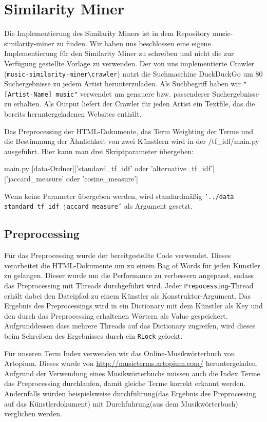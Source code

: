 \documentclass[prodmode,acmtecs]{acmsmall} %
\begin{document}
\section{Similarity Miner}
Die Implementierung des Similarity Miners ist in dem Repository music-similarity-miner \cite{music-similarity-miner} zu finden. Wir haben uns beschlossen eine eigene Implementierung für den Similarity Miner zu schreiben und nicht die zur Verfügung gestellte Vorlage zu verwenden. Der von uns implementierte Crawler (\lstinline$music-similarity-miner\crawler$) nutzt die Suchmaschine DuckDuckGo um 80 Suchergebnisse zu jedem Artist herunterzuladen. Als Suchbegriff haben wir \lstinline$"[Artist-Name] music"$ verwendet um genauere bzw. passenderer Suchergebnisse zu erhalten. Als Output liefert der Crawler für jeden Artist ein Textfile, das die bereits heruntergeladenen Websites enthält.

Das Preprocessing der HTML-Dokumente, das Term Weighting der Terme und die Bestimmung der Ähnlichkeit von zwei Künstlern wird in der /tf\_idf/main.py ausgeführt.
Hier kann man drei Skriptparameter übergeben: 
\begin{python}
main.py [data-Ordner]['standard_tf_idf' oder 'alternative_tf_idf']
['jaccard_measure' oder 'cosine_measure']
\end{python}
Wenn keine Parameter übergeben werden, wird standardmäßig \texttt{'../data standard\_tf\_idf jaccard\_measure'} als Argument gesetzt. 


\subsection{Preprocessing}
Für das Preprocessing wurde der bereitgestellte Code verwendet. Dieses verarbeitet die HTML-Dokumente um zu einem Bag of Words für jeden Künstler zu gelangen. Dieser wurde um die Performance zu verbessern angepasst, sodass das Preprocessing mit Threads durchgeführt wird. Jeder \texttt{Prepocessing}-Thread erhält dabei den Dateipfad zu einem Künstler als Konstruktor-Argument. Das Ergebnis des Preprocessings wird in ein Dictionary mit dem Künstler als Key und den durch das Preprocessing erhaltenen Wörtern als Value gespeichert. Aufgrunddessen dass mehrere Threads auf das Dictionary zugreifen, wird dieses beim Schreiben des Ergebnisses durch ein \texttt{RLock} gelockt.

Für unseren Term Index verwenden wir das Online-Musikwörterbuch von Artopium. Dieses wurde von \url{http://musicterms.artopium.com/} heruntergeladen.
Aufgrund der Verwendung eines Musikwörterbuchs müssen auch die Index Terme das Preprocessing durchlaufen, damit gleiche Terme korrekt erkannt werden. Andernfalls würden beispielsweise \glqq durchfuhrung\grqq (das Ergebnis des Preprocessing auf das Künstlerdokument) mit \glqq Durchfuhrung\grqq (aus dem Musikwörterbuch) verglichen werden.
\end{document}

